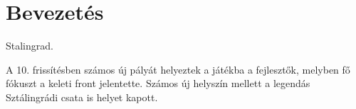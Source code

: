 \chapter{Bevezetés}
Stalingrad. ~\cite{WikiCarentan}

A 10. frissítésben számos új pályát helyeztek a játékba a fejlesztők, melyben fő fókuszt a keleti front jelentette.
Számos új helyszín mellett a legendás Sztálingrádi csata is helyet kapott.